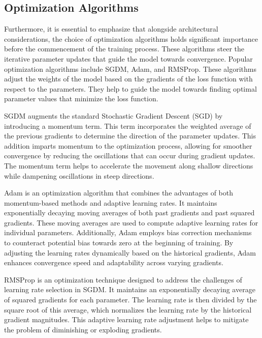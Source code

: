 \subsection{Optimization Algorithms}
Furthermore, it is essential to emphasize that alongside architectural considerations, the choice of optimization algorithms holds significant importance before the commencement of the training process. These algorithms steer the iterative parameter updates that guide the model towards convergence. Popular optimization algorithms include \ac{SGDM}, \ac{Adam}, and \ac{RMSProp}. These algorithms adjust the weights of the model based on the gradients of the loss function with respect to the parameters. They help to guide the model towards finding optimal parameter values that minimize the loss function.

\ac{SGDM} augments the standard Stochastic Gradient Descent (SGD) by introducing a momentum term. This term incorporates the weighted average of the previous gradients to determine the direction of the parameter updates. This addition imparts momentum to the optimization process, allowing for smoother convergence by reducing the oscillations that can occur during gradient updates. The momentum term helps to accelerate the movement along shallow directions while dampening oscillations in steep directions. 

\ac{Adam} is an optimization algorithm that combines the advantages of both momentum-based methods and adaptive learning rates. It maintains exponentially decaying moving averages of both past gradients and past squared gradients. These moving averages are used to compute adaptive learning rates for individual parameters. Additionally, \ac{Adam} employs bias correction mechanisms to counteract potential bias towards zero at the beginning of training. By adjusting the learning rates dynamically based on the historical gradients, \ac{Adam} enhances convergence speed and adaptability across varying gradients.

\ac{RMSProp} is an optimization technique designed to address the challenges of learning rate selection in \ac{SGDM}. It maintains an exponentially decaying average of squared gradients for each parameter. The learning rate is then divided by the square root of this average, which normalizes the learning rate by the historical gradient magnitudes. This adaptive learning rate adjustment helps to mitigate the problem of diminishing or exploding gradients.

